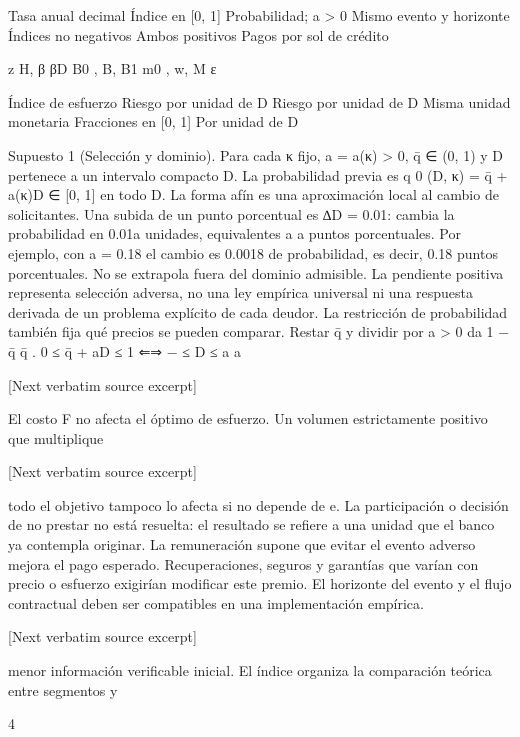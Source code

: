\documentclass[10pt]{article}
\begin{document}
\begin{ReviewVerbatim}
Tasa anual decimal
Índice en [0, 1]
Probabilidad; a > 0
Mismo evento y horizonte
Índices no negativos
Ambos positivos
Pagos por sol de crédito

z
H, β
βD
B0 , B, B1
m0 , w, M
ε

Índice de esfuerzo
Riesgo por unidad de D
Riesgo por unidad de D
Misma unidad monetaria
Fracciones en [0, 1]
Por unidad de D

Supuesto 1 (Selección y dominio). Para cada κ ﬁjo, a = a(κ) > 0, q̄ ∈ (0, 1) y D pertenece a un
intervalo compacto D. La probabilidad previa es q 0 (D, κ) = q̄ + a(κ)D ∈ [0, 1] en todo D.
La forma afín es una aproximación local al cambio de solicitantes. Una subida de un punto
porcentual es ∆D = 0.01: cambia la probabilidad en 0.01a unidades, equivalentes a a puntos porcentuales. Por ejemplo, con a = 0.18 el cambio es 0.0018 de probabilidad, es decir, 0.18 puntos
porcentuales. No se extrapola fuera del dominio admisible. La pendiente positiva representa selección adversa, no una ley empírica universal ni una respuesta derivada de un problema explícito de
cada deudor.
La restricción de probabilidad también ﬁja qué precios se pueden comparar. Restar q̄ y dividir
por a > 0 da
1 − q̄
q̄
.
0 ≤ q̄ + aD ≤ 1 ⇐⇒ − ≤ D ≤
a
a

[Next verbatim source excerpt]

El costo F no afecta el óptimo de esfuerzo. Un volumen estrictamente positivo que multiplique

[Next verbatim source excerpt]

todo el objetivo tampoco lo afecta si no depende de e. La participación o decisión de no prestar
no está resuelta: el resultado se reﬁere a una unidad que el banco ya contempla originar. La remuneración supone que evitar el evento adverso mejora el pago esperado. Recuperaciones, seguros y
garantías que varían con precio o esfuerzo exigirían modiﬁcar este premio. El horizonte del evento
y el ﬂujo contractual deben ser compatibles en una implementación empírica.

[Next verbatim source excerpt]

menor información veriﬁcable inicial. El índice organiza la comparación teórica entre segmentos y

4



\end{ReviewVerbatim}
\end{document}
